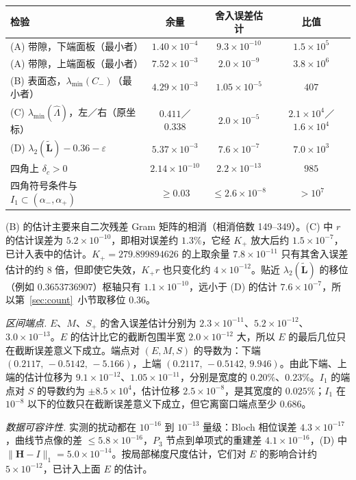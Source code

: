 \documentclass[11pt,a4paper,fontset=fandol]{ctexart}
\theoremstyle{plain}
\theoremstyle{definition}
\theoremstyle{remark}
\begin{document}
\begin{center}
\small
\begin{tabular}{lccc}
\toprule
检验 & 余量 & 舍入误差估计 & 比值 \\
\midrule
(A) 带隙，下端面板（最小者） & $1.40\times10^{-4}$ & $9.3\times10^{-10}$ & $1.5\times10^5$ \\
(A) 带隙，上端面板（最小者） & $7.52\times10^{-3}$ & $2.0\times10^{-9}$ & $3.8\times10^6$ \\
(B) 表面态，$\lambda_{\min}(C_-)$（最小者） & $4.29\times10^{-3}$ & $1.05\times10^{-5}$ & $407$ \\
(C) $\lambda_{\min}(\hat\Lambda)$，左／右（原坐标） & $0.411$／$0.338$ & $2.0\times10^{-5}$ & $2.1\times10^4$／$1.6\times10^4$ \\
(D) $\lambda_2(\tilde{\bm L})-0.36-\varepsilon$ & $5.37\times10^{-3}$ & $7.6\times10^{-7}$ & $7.0\times10^3$ \\
四角上 $\delta_c>0$ & $2.14\times10^{-10}$ & $2.2\times10^{-13}$ & $985$ \\
四角符号条件与 $I_1\subset(\alpha_-,\alpha_+)$ & $\ge0.03$ & $\le2.6\times10^{-8}$ & $>10^7$ \\
\bottomrule
\end{tabular}
\end{center}
(B) 的估计主要来自二次残差 Gram 矩阵的相消（相消倍数 149--349）。(C) 中 $r$ 的估计误差为 $5.2\times10^{-10}$，即相对误差约 $1.3\%$，它经 $K_+$ 放大后约 $1.5\times10^{-7}$，已计入表中的估计。$K_+=279.899894626$ 的上取余量 $7.8\times10^{-11}$ 只有其舍入误差估计的约 8 倍，但即使它失效，$K_+r$ 也只变化约 $4\times10^{-12}$。贴近 $\lambda_2(\tilde{\bm L})$ 的移位（例如 $0.3653736907$）枢轴只有 $1.1\times10^{-10}$，远小于 (D) 的估计 $7.6\times10^{-7}$，所以第~\ref{sec:count}~小节取移位 $0.36$。

\emph{区间端点.} $E$、$M$、$S_+$ 的舍入误差估计分别为 $2.3\times10^{-11}$、$5.2\times10^{-12}$、$3.0\times10^{-13}$。$E$ 的估计比它的截断包围半宽 $2.0\times10^{-12}$ 大，所以 $E$ 的最后几位只在截断误差意义下成立。端点对 $(E,M,S)$ 的导数为：下端 $(0.2117,\,-0.5142,\,-5.166)$，上端 $(0.2117,\,-0.5142,\,9.946)$。由此下端、上端的估计位移为 $9.1\times10^{-12}$、$1.05\times10^{-11}$，分别是宽度的 $0.20\%$、$0.23\%$。$I_1$ 的端点对 $S$ 的导数约为 $\pm8.5\times10^4$，估计位移 $2.5\times10^{-8}$，是其宽度的 $0.025\%$；$I_1$ 在 $10^{-8}$ 以下的位数只在截断误差意义下成立，但它离窗口端点至少 $0.686$。

\emph{数据可容许性.} 实测的扰动都在 $10^{-16}$ 到 $10^{-13}$ 量级：Bloch 相位误差 $4.3\times10^{-17}$，曲线节点像的差 $\le5.8\times10^{-16}$，$P_3$ 节点到单项式的重建差 $4.1\times10^{-16}$，(D) 中 $\|\bm H-I\|_1=5.0\times10^{-14}$。按局部梯度尺度估计，它们对 $E$ 的影响合计约 $5\times10^{-12}$，已计入上面 $E$ 的估计。
\end{document}
